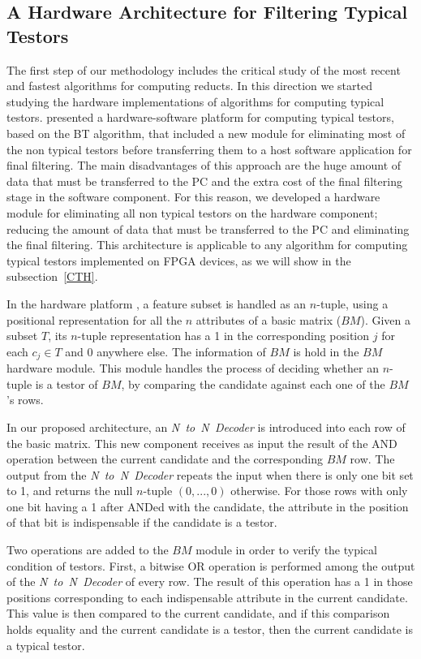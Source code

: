 \documentclass[authoryear,11pt]{elsarticle}
\begin{document}
\subsection{A Hardware Architecture for Filtering Typical Testors}\label{OnlyTT}
	The first step of our methodology includes the critical study of the most recent and fastest algorithms for 
	computing reducts. In this direction we started studying the hardware implementations of algorithms for 
	computing typical testors. \cite{Rojas12} presented a hardware-software platform for computing typical testors,
	based on the BT algorithm, that included a new module for eliminating most of the non typical testors before 
	transferring them to a host software application for final filtering. 
	The main disadvantages of this approach are the huge amount of data that must be transferred to the PC and 
	the extra cost of the final filtering stage in the software component.  
	For this reason, we developed a hardware module for eliminating all non typical testors on the hardware
	component; reducing the amount of data that must be transferred to the PC and eliminating the final filtering. 	
	This architecture is applicable to any algorithm for computing typical testors implemented on FPGA devices,
	as we will show in the subsection~\ref{CTH}.
	
	In the hardware platform \citep{Rojas12}, a feature subset is handled as an $n$-tuple, using a positional 
	representation for all the $n$ attributes of a basic matrix ($BM$). Given a subset $T$, its $n$-tuple 
	representation has a 1 in the corresponding position $j$ for each $c_j \in T$ and 0 anywhere else.
	The information of $BM$ is hold in the $BM$ hardware module. This module handles the process of 
	deciding whether an $n$-tuple is a testor of $BM$, by comparing the candidate against each one of the 
	$BM$'s rows.

	In our proposed architecture, an \textit{N~to~N~Decoder} is introduced into each 
	row of the basic matrix. This new component receives as input 
	the result of the AND operation between the current candidate and the corresponding $BM$ row.
	The output from the \textit{N~to~N~Decoder} repeats the input when there is only one bit set
	to 1, and returns the null $n$-tuple $(0,...,0)$ otherwise. For those rows with only one bit having a 
	1 after ANDed with the candidate, the attribute in the position of that bit is indispensable if the 
	candidate is a testor.
	
	Two operations are added to the $BM$ module in order to verify the typical condition of testors.
	First, a bitwise OR operation is performed among the output of the \textit{N~to~N~Decoder} of every row. 
	The result of this operation has a 1 in those positions corresponding to each indispensable attribute in the
	current 	candidate. This value is then compared to the current candidate, and 	if this comparison 
	holds equality and the current candidate is a testor, then the current candidate is a typical testor.
	
\end{document}
